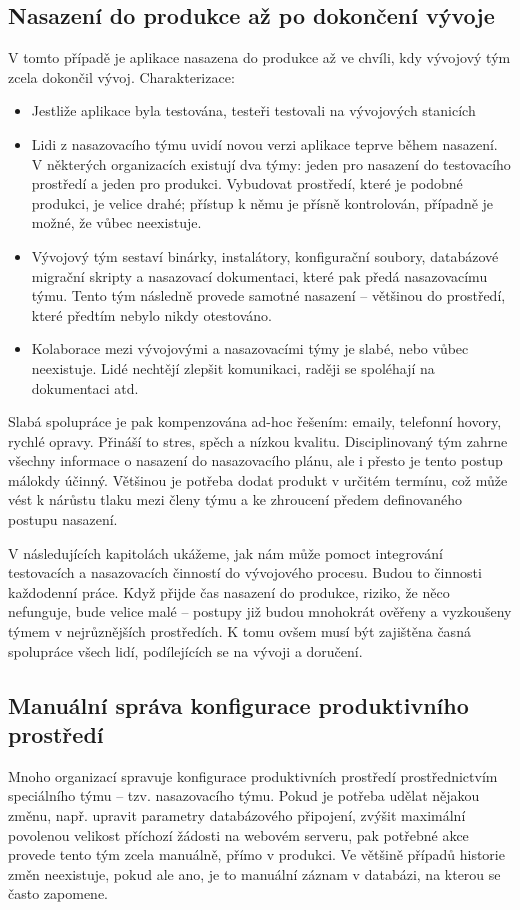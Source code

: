 \subsection{Nasazení do produkce až po dokončení vývoje}
V tomto případě je aplikace nasazena do produkce až ve chvíli, kdy vývojový tým zcela dokončil vývoj. Charakterizace:

\begin{itemize}
  \item Jestliže aplikace byla testována, testeři testovali na vývojových stanicích
  \item Lidi z nasazovacího týmu uvidí novou verzi aplikace teprve během nasazení. V některých organizacích existují dva týmy: jeden pro nasazení do testovacího prostředí a jeden pro produkci. Vybudovat prostředí, které je podobné produkci, je velice drahé; přístup k němu je přísně kontrolován, případně je možné, že vůbec neexistuje.
  \item Vývojový tým sestaví binárky, instalátory, konfigurační soubory, databázové migrační skripty a nasazovací dokumentaci, které pak předá nasazovacímu týmu. Tento tým následně provede samotné nasazení -- většinou do prostředí, které předtím nebylo nikdy otestováno.  
  \item Kolaborace mezi vývojovými a nasazovacími týmy je slabé, nebo vůbec neexistuje. Lidé nechtějí zlepšit komunikaci, raději se spoléhají na dokumentaci atd.
\end{itemize}

Slabá spolupráce je pak kompenzována ad-hoc řešením: emaily, telefonní hovory, rychlé opravy. Přináší to stres, spěch a nízkou kvalitu. Disciplinovaný tým zahrne všechny informace o nasazení do nasazovacího plánu, ale i přesto je tento postup málokdy účinný. Většinou je potřeba dodat produkt v určitém termínu, což může vést k nárůstu tlaku mezi členy týmu a ke zhroucení předem definovaného postupu nasazení. 

V následujících kapitolách ukážeme, jak nám může pomoct integrování testovacích a nasazovacích činností do vývojového procesu. Budou to činnosti každodenní práce. Když přijde čas nasazení do produkce, riziko, že něco nefunguje, bude velice malé -- postupy již budou mnohokrát ověřeny a vyzkoušeny týmem v nejrůznějších prostředích. K tomu ovšem musí být zajištěna časná spolupráce všech lidí, podílejících se na vývoji a doručení.

\subsection{Manuální správa konfigurace produktivního prostředí}
Mnoho organizací spravuje konfigurace produktivních prostředí prostřednictvím speciálního týmu -- tzv. nasazovacího týmu. Pokud je potřeba udělat nějakou změnu, např. upravit parametry databázového připojení, zvýšit maximální povolenou velikost příchozí žádosti na webovém serveru, pak potřebné akce provede tento tým zcela manuálně, přímo v produkci. Ve většině případů historie změn neexistuje, pokud ale ano, je to manuální záznam v databázi, na kterou se často zapomene.

